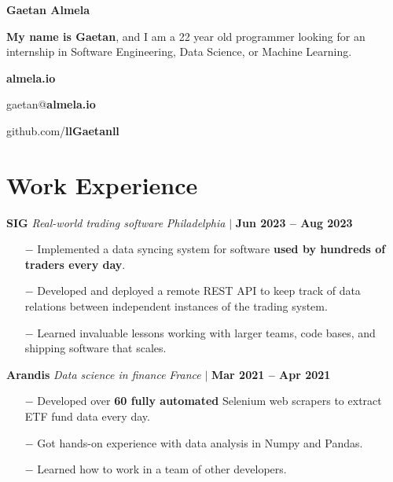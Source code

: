 \documentclass[12pt]{article}
\newcommand{\bigtitle}[5]{
  {\bf \large #1} \textemdash{} {\large \it #2} \hfill {#3}

  {\small #4}

  \smallskip

  #5 %

  \medskip
}
\begin{document}
    {\fontsize{40}{50} \selectfont \bf \intertabular Gaetan Almela}

    \smallskip

    {\bf My name is Gaetan}, and I am a 22 year old programmer looking for an
    internship in Software Engineering, Data Science, or Machine Learning.

    \begin{center}
      \begin{multicols}{3}
       {\bf almela.io}

       gaetan@{\bf almela.io}

       github.com/{\bf llGaetanll}
      \end{multicols}
    \end{center}

    \section{Work Experience}

    \smallskip

    \bigtitle{SIG}{Real-world trading software}
    {
      \textit{Philadelphia} $\big|$ \textbf{Jun 2023 -- Aug 2023}
    }
    {}
    {
      \begin{itemize}
        \item[$-$] Implemented a data syncing system for software {\bf used by
          hundreds of traders every day}.
        \item[$-$] Developed and deployed a remote REST API to keep track of data
          relations between independent instances of the trading system.
        \item[$-$] Learned invaluable lessons working with larger teams,
          code bases, and shipping software that scales.
      \end{itemize}
    }

    \bigtitle{Arandis}{Data science in finance}
    {
      \textit{France} $\big|$ \textbf{Mar 2021 -- Apr 2021}
    }
    {}
    {
      \begin{itemize}
        \item[$-$] Developed over {\bf 60 fully automated} Selenium web scrapers to extract
              ETF fund data every day.
        \item[$-$] Got hands-on experience with data analysis in Numpy and Pandas.
        \item[$-$] Learned how to work in a team of other developers.
      \end{itemize}
    }
\end{document}
